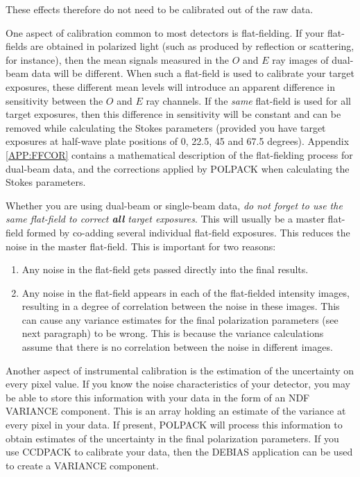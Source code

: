 \documentclass[twoside,11pt]{article}
\newcommand{\hyperref}[4]{#2\ref{#4}#3}
\newcommand{\xref}[3]{#1}
\renewcommand{\_}{\texttt{\symbol{95}}}
\begin{document}
These effects therefore do not need to be calibrated out of the raw data.

One aspect of calibration common to most detectors is flat-fielding. If
your flat-fields are obtained in polarized light (such as produced by
reflection or scattering, for instance), then the mean signals measured
in the $O$ and $E$ ray images of dual-beam data will be different. When 
such a flat-field
is used to calibrate your target exposures, these different mean levels
will introduce an apparent difference in sensitivity between the $O$ and
$E$ ray channels. If the \emph{same} flat-field is used for all target
exposures, then this difference in sensitivity will be constant and can
be removed while calculating the Stokes parameters (provided you have
target exposures at half-wave plate positions of 0, 22.5, 45 and 67.5
degrees). \hyperref{Go here for}{Appendix }{ contains}{APP:FFCOR} a
mathematical description of the flat-fielding process for dual-beam data, 
and the corrections applied by POLPACK when calculating the Stokes parameters.

Whether you are using dual-beam or single-beam data, \emph{do not forget to
use the same flat-field to correct \textbf{all} target exposures}. This
will usually be a master flat-field formed by co-adding several
individual flat-field exposures. This reduces the noise in the master
flat-field. This is important for two reasons:

\begin{enumerate}
\item Any noise in the flat-field gets passed directly into the final results.
\item Any noise in the flat-field appears in each of the flat-fielded
intensity images, resulting in a degree of correlation between the noise in 
these images. This can cause any variance estimates for the final
polarization parameters (see next paragraph) to be wrong. This is because 
the variance calculations assume that there is no correlation between the 
noise in different images. 
\end{enumerate}

Another aspect of instrumental calibration is the estimation of the
uncertainty on every pixel value. If you know the noise characteristics
of your detector, you may be able to store this information with your
data in the form of an NDF VARIANCE component. This is an array
holding an estimate of the variance at every pixel in your data. If
present, POLPACK will process this information to obtain estimates of the
uncertainty in the final polarization parameters. If you use CCDPACK to
calibrate your data, then the \xref{DEBIAS}{sun139}{DEBIAS} application
can be used to create a VARIANCE component.
\end{document}
